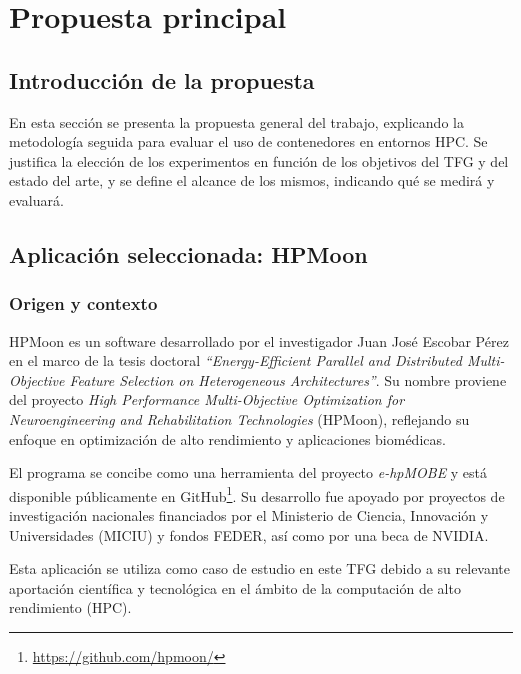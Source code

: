\chapter{Propuesta principal}\label{cap:propuesta}


\section{Introducción de la propuesta}\label{sec:introduccion_propuesta}
En esta sección se presenta la propuesta general del trabajo, explicando la metodología seguida para evaluar el uso de contenedores en entornos HPC. Se justifica la elección de los experimentos en función de los objetivos del TFG y del estado del arte, y se define el alcance de los mismos, indicando qué se medirá y evaluará.

\section{Aplicación seleccionada: HPMoon}\label{sec:hpm_application}

\subsection{Origen y contexto}\label{subsec:hpm_origen}

HPMoon es un software desarrollado por el investigador Juan José Escobar Pérez en el marco de la tesis doctoral \textit{``Energy-Efficient Parallel and Distributed Multi-Objective Feature Selection on Heterogeneous Architectures''}. Su nombre proviene del proyecto \textit{High Performance Multi-Objective Optimization for Neuroengineering and Rehabilitation Technologies} (HPMoon), reflejando su enfoque en optimización de alto rendimiento y aplicaciones biomédicas.

El programa se concibe como una herramienta del proyecto \textit{e-hpMOBE} y está disponible públicamente en GitHub\footnote{\url{https://github.com/hpmoon/}}. Su desarrollo fue apoyado por proyectos de investigación nacionales financiados por el Ministerio de Ciencia, Innovación y Universidades (MICIU) y fondos FEDER, así como por una beca de NVIDIA.

Esta aplicación se utiliza como caso de estudio en este TFG debido a su relevante aportación científica y tecnológica en el ámbito de la computación de alto rendimiento (\acs{HPC}).

